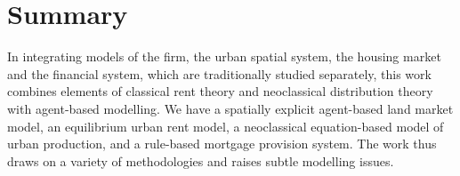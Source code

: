 









\section{Summary}\label{sec-summary}
In integrating models of the firm, the urban spatial system, the housing market and the financial system,  which are traditionally studied separately, this work combines elements of classical rent theory and neoclassical distribution theory with agent-based modelling. We have a spatially explicit agent-based land market model, an equilibrium urban rent model, a neoclassical equation-based model of urban production, and a rule-based mortgage provision system. The work thus draws on %
a variety of methodologies and raises subtle modelling issues. 

